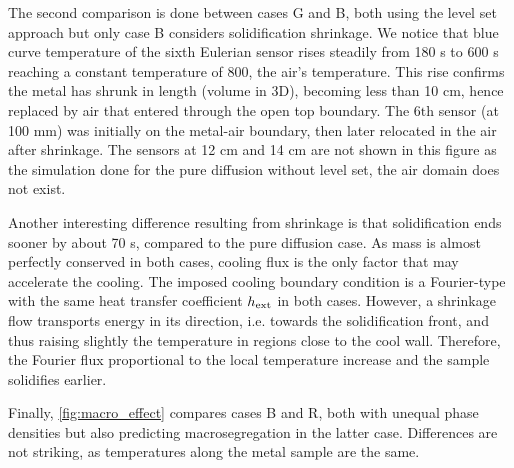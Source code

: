 The second comparison is done between cases G and B, both using the level set approach but only case B considers solidification shrinkage.
We notice that blue curve temperature of the sixth 
Eulerian sensor rises steadily from 180 s to 600 s reaching a constant temperature of \SI{800}{\udegC}, the air's temperature. 
This rise confirms the metal has shrunk in length (volume in 3D),
becoming less than 10 cm, hence replaced by air that entered through the open top boundary.
The 6$\text{th}$ sensor (at 100 mm) was initially on the metal-air boundary, then later relocated in the air after shrinkage.
The sensors at 12 cm and 14 cm are not shown in this figure as the simulation done for the pure diffusion without level set, the air domain does not exist.

Another interesting difference resulting from shrinkage is that solidification ends sooner by about 70 s, compared to the pure diffusion case.
As mass is almost perfectly conserved in both cases, cooling flux is the only factor that may accelerate the cooling. The imposed cooling boundary condition
is a Fourier-type with the same heat transfer coefficient $h_{\text{ext}}$ in both cases. However, a shrinkage flow transports energy in its direction, i.e. towards the solidification
front, and thus raising slightly the temperature in regions close to the cool wall. Therefore, the Fourier flux proportional to the local temperature
increase and the sample solidifies earlier. 

Finally, \cref{fig:macro_effect} compares cases B and R, both with unequal phase densities but also predicting macrosegregation in the latter case. 
Differences are not striking, as temperatures along the metal sample are the same. 

